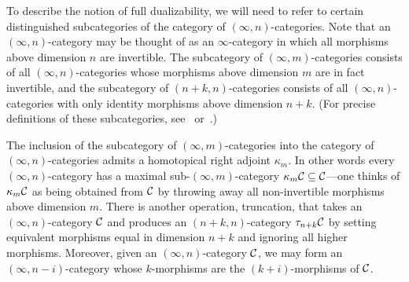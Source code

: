 \documentclass{amsart}
\begin{document}

To describe the notion of full dualizability, we will need to refer to certain distinguished subcategories of the category of $(\infty,n)$-categories.  Note that an $(\infty,n)$-category may be thought of as an $\infty$-category in which all morphisms above dimension $n$ are invertible.  The subcategory of $(\infty,m)$-categories consists of all $(\infty,n)$-categories whose morphisms above dimension $m$ are in fact invertible, and the subcategory of $(n+k,n)$-categories consists of all $(\infty,n)$-categories with only identity morphisms above dimension $n+k$.  (For precise definitions of these subcategories, see~\cite{Rezk} or~\cite{Barwick-SP}.)

The inclusion of the subcategory of $(\infty,m)$-categories into the category of $(\infty, n)$-categories admits a homotopical right adjoint $\kappa_m$.  In other words every $(\infty,n)$-category has a maximal sub-$(\infty,m)$-category $\kappa_m \mathcal C \subseteq \mathcal C$---one thinks of $\kappa_m \mathcal C$ as being obtained from $\mathcal C$ by throwing away all non-invertible morphisms above dimension $m$.   There is another operation, truncation, that takes an $(\infty,n)$-category $\mathcal C$ and produces an $(n+k,n)$-category $\tau_{n+k} \mathcal C$ by setting equivalent morphisms equal in dimension $n+k$ and ignoring all higher morphisms.  Moreover, given an $(\infty,n)$-category $\mathcal C$, we may form an $(\infty,n-i)$-category whose $k$-morphisms are the $(k+i)$-morphisms of $\mathcal C$.
\end{document}
